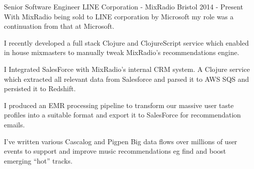 \begin{cventries}

  \cventrypara
    {Senior Software Engineer} %
    {LINE Corporation - MixRadio} %
    {Bristol} %
    {2014  - Present} %
    {With MixRadio being sold to LINE corporation by Microsoft my role was a continuation from that at Microsoft.}
    {
      \begin{cvitems} %
        \item {I recently developed a full stack Clojure and ClojureScript service which enabled in house mixmasters to manually tweak MixRadio's recommendations engine.}
        \item {I Integrated SalesForce with MixRadio’s internal CRM system. A Clojure service which extracted all relevant data from Salesforce and parsed it to AWS SQS and persisted it to Redshift.}
        \item {I produced an EMR processing pipeline to transform our massive user taste profiles into a suitable format and export it to SalesForce for recommendation emails.}
        \item {I’ve written various Cascalog and Pigpen Big data flows over millions of user events to support and improve music recommendations eg find and boost emerging “hot” tracks.}
      \end{cvitems}
    }


\end{cventries}
